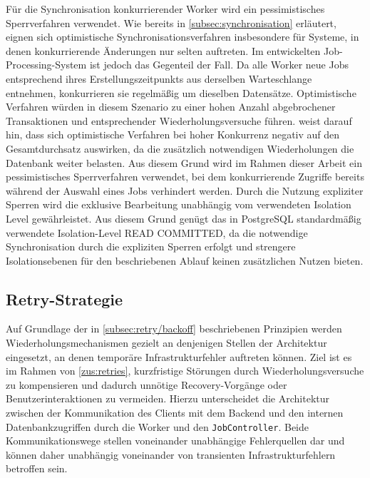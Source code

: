 Für die Synchronisation konkurrierender Worker wird ein pessimistisches Sperrverfahren verwendet.
Wie bereits in \cref{subsec:synchronisation} erläutert, eignen sich optimistische Synchronisationsverfahren insbesondere
für Systeme, in denen konkurrierende Änderungen nur selten auftreten.
Im entwickelten Job-Processing-System ist jedoch das Gegenteil der Fall.
Da alle Worker neue Jobs entsprechend ihres Erstellungszeitpunkts aus derselben Warteschlange entnehmen, konkurrieren sie
regelmäßig um dieselben Datensätze.
Optimistische Verfahren würden in diesem Szenario zu einer hohen Anzahl abgebrochener Transaktionen und entsprechender Wiederholungsversuche führen.
\textcite[Kap.~7 Abschnitt \glqq Pessimistic versus optimistic concurrency control\grqq]{kleppmann_designing_2017}
weist darauf hin, dass sich optimistische Verfahren bei hoher Konkurrenz negativ auf den Gesamtdurchsatz auswirken,
da die zusätzlich notwendigen Wiederholungen die Datenbank weiter belasten.
Aus diesem Grund wird im Rahmen dieser Arbeit ein pessimistisches Sperrverfahren verwendet, bei dem konkurrierende
Zugriffe bereits während der Auswahl eines Jobs verhindert werden.
Durch die Nutzung expliziter Sperren wird die exklusive Bearbeitung unabhängig vom verwendeten Isolation Level gewährleistet.
Aus diesem Grund genügt das in PostgreSQL standardmäßig verwendete Isolation-Level READ COMMITTED, da die notwendige Synchronisation
durch die expliziten Sperren erfolgt und strengere Isolationsebenen für den beschriebenen Ablauf keinen zusätzlichen Nutzen bieten.

\subsection{Retry-Strategie}
\label{subsec:retryStrategie}
Auf Grundlage der in \cref{subsec:retry/backoff} beschriebenen Prinzipien werden Wiederholungsmechanismen gezielt an denjenigen
Stellen der Architektur eingesetzt, an denen temporäre Infrastrukturfehler auftreten können.
Ziel ist es im Rahmen von \ref{zus:retries}, kurzfristige Störungen durch Wiederholungsversuche zu kompensieren und
dadurch unnötige Recovery-Vorgänge oder Benutzerinteraktionen zu vermeiden.
Hierzu unterscheidet die Architektur zwischen der Kommunikation des Clients mit dem Backend und den internen
Datenbankzugriffen durch die Worker und den \texttt{JobController}.
Beide Kommunikationswege stellen voneinander unabhängige Fehlerquellen dar und können daher unabhängig voneinander von
transienten Infrastrukturfehlern betroffen sein.

